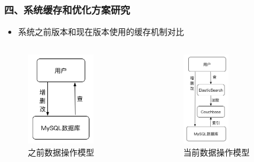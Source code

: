 \documentclass{beamer}
\begin{document}
\begin{frame}
\frametitle{四、系统缓存和优化方案研究}
  \begin{itemize}
    \item 系统之前版本和现在版本使用的缓存机制对比
  \end{itemize} 
  \begin{columns}
    \begin{column}{0.50\textwidth}
      \begin{figure}
        \centering
          \includegraphics[height=4cm]{./img/couchbase1.png}
        \caption{之前数据操作模型}
        \label{fig:visual}
      \end{figure}
    \end{column}
    \begin{column}{0.50\textwidth}
      \begin{figure}
        \centering
          \includegraphics[height=4cm]{./img/couchbase2.png}
        \caption{当前数据操作模型}
        \label{fig:visual}
      \end{figure}
    \end{column}
  \end{columns}
\end{frame}
\end{document}
